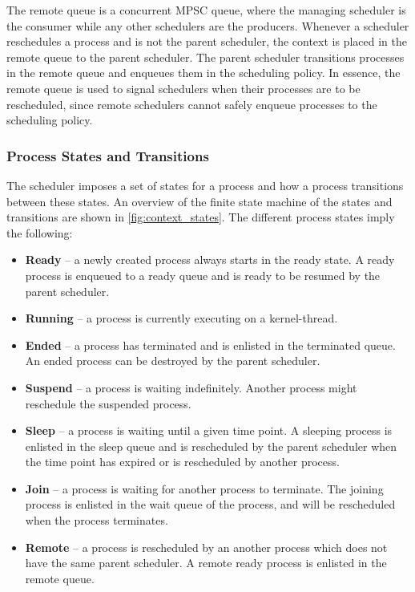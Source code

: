 The remote queue is a concurrent MPSC queue, where the managing scheduler is the consumer while any other schedulers are the producers. Whenever a scheduler reschedules a process and is not the parent scheduler, the context is placed in the remote queue to the parent scheduler. The parent scheduler transitions processes in the remote queue and enqueues them in the scheduling policy. In essence, the remote queue is used to signal schedulers when their processes are to be rescheduled, since remote schedulers cannot safely enqueue processes to the scheduling policy.


\subsubsection{Process States and Transitions}


The scheduler imposes a set of states for a process and how a process transitions between these states. An overview of the finite state machine of the states and transitions are shown in \cref{fig:context_states}. The different process states imply the following:

\begin{itemize}[topsep=0em,itemsep=-1em,partopsep=0.5em,parsep=1em]
    \item \textbf{Ready} -- a newly created process always starts in the ready state. A ready process is enqueued to a ready queue and is ready to be resumed by the parent scheduler.
    \item \textbf{Running} -- a process is currently executing on a kernel\hyp{}thread.
    \item \textbf{Ended} -- a process has terminated and is enlisted in the terminated queue. An ended process can be destroyed by the parent scheduler.
    \item \textbf{Suspend} -- a process is waiting indefinitely. Another process might reschedule the suspended process.
    \item \textbf{Sleep} -- a process is waiting until a given time point. A sleeping process is enlisted in the sleep queue and is rescheduled by the parent scheduler when the time point has expired or is rescheduled by another process.
    \item \textbf{Join} -- a process is waiting for another process to terminate. The joining process is enlisted in the wait queue of the process, and will be rescheduled when the process terminates.
    \item \textbf{Remote} -- a process is rescheduled by an another process which does not have the same parent scheduler. A remote ready process is enlisted in the remote queue.
\end{itemize}

